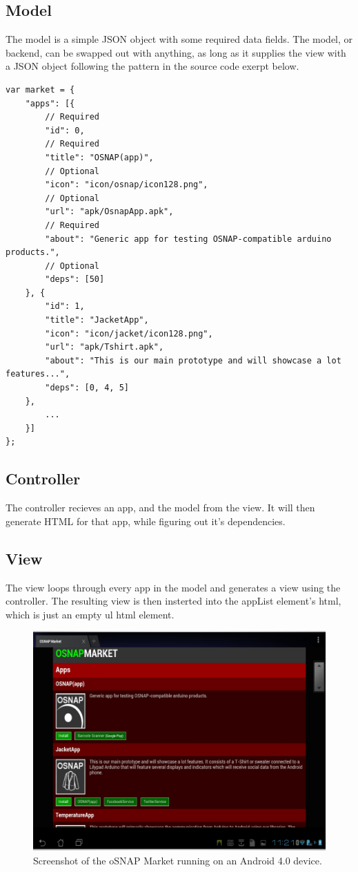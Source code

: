 \subsection{Model}
The model is a simple JSON object with some required data fields. The model, or backend, can be swapped out with anything, as long as it supplies the view with a JSON object following the pattern in the source code exerpt below.
\javacode
\begin{lstlisting}
var market = {
    "apps": [{
        // Required
        "id": 0,
        // Required
        "title": "OSNAP(app)",
        // Optional
        "icon": "icon/osnap/icon128.png",
        // Optional
        "url": "apk/OsnapApp.apk",
        // Required
        "about": "Generic app for testing OSNAP-compatible arduino products.",
        // Optional
        "deps": [50]
    }, {
        "id": 1,
        "title": "JacketApp",
        "icon": "icon/jacket/icon128.png",
        "url": "apk/Tshirt.apk",
        "about": "This is our main prototype and will showcase a lot features...",
        "deps": [0, 4, 5]
    },
        ...
    }]
};
\end{lstlisting}

\subsection{Controller}
The controller recieves an app, and the model from the view. It will then generate HTML for that app, while figuring out it's dependencies.

\subsection{View}
The view loops through every app in the model and generates a view using the controller. The resulting view is then insterted into the appList element's html, which is just an empty ul html element.

\begin{figure}
	\begin{center}
	\includegraphics[scale=0.4]{img/market-screen.png}
	\end{center}
	\caption{Screenshot of the oSNAP Market running on an Android 4.0 device.}
	\label{fig:market-screen}
\end{figure}
